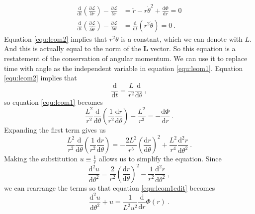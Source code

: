 \documentclass[english, oneside]{HYgradu}
\begin{document}
\begin{align}
\frac{\mathrm{d} }{\mathrm{d} t} \left( \frac{\partial \mathcal{L}}{\partial \dot{r}} \right) - \frac{\partial \mathcal{L}}{\partial r} &= \ddot{r} - r \dot{\theta}^2 + \frac{\mathrm{d} \Phi}{\mathrm{d} r} = 0 \label{equ:leom1} \\
\frac{\mathrm{d} }{\mathrm{d} t} \left( \frac{\partial \mathcal{L}}{\partial \dot{\theta}} \right) - \frac{\partial \mathcal{L}}{\partial \theta} &= \frac{\mathrm{d}}{\mathrm{d} t} (r^2 \dot{\theta}) = 0 \label{equ:leom2} \ .
\end{align}
Equation \eqref{equ:leom2} implies that $r^2 \dot{\theta}$ is a constant, which we can denote with $L$. And this is actually equal to the norm of the $\mathbf{L}$ vector. So this equation is a restatement of the conservation of angular momentum. We can use it to replace time with angle as the independent variable in equation \eqref{equ:leom1}. Equation \eqref{equ:leom2} implies that
\begin{equation}
\frac{\mathrm{d}}{\mathrm{d} t} = \frac{L}{r^2} \frac{\mathrm{d}}{\mathrm{d} \theta} \ ,
\end{equation}
so equation \eqref{equ:leom1} becomes
\begin{equation}
\frac{L^2}{r^2} \frac{\mathrm{d}}{\mathrm{d} \theta} \left( \frac{1}{r^2} \frac{\mathrm{d} r}{\mathrm{d} \theta} \right) - \frac{L^2}{r^3} = -\frac{\mathrm{d} \Phi}{\mathrm{d} r} \label{equ:leom1edit} \ .
\end{equation}
Expanding the first term gives us 
\begin{equation}
\frac{L^2}{r^2} \frac{\mathrm{d}}{\mathrm{d} \theta} \left( \frac{1}{r^2} \frac{\mathrm{d} r}{\mathrm{d} \theta} \right) = -\frac{2 L^2}{r^5} \left( \frac{\mathrm{d} r}{\mathrm{d} \theta} \right)^2 + \frac{L^2}{r^4} \frac{\mathrm{d}^2 r}{\mathrm{d} \theta^2} \ .
\end{equation}
Making the substitution $u \equiv \frac{1}{r}$ allows us to simplify the equation. Since
\begin{equation}
\frac{\mathrm{d}^2 u}{\mathrm{d} \theta^2} = \frac{2}{r^2} \left( \frac{\mathrm{d} r}{\mathrm{d} \theta} \right)^2 - \frac{1}{r^2} \frac{\mathrm{d}^2 r}{\mathrm{d} \theta^2} \ ,
\end{equation}
we can rearrange the terms so that equation \eqref{equ:leom1edit} becomes
\begin{equation}
\frac{\mathrm{d}^2 u}{\mathrm{d} \theta^2} + u = \frac{1}{L^2 u^2} \frac{\mathrm{d}}{\mathrm{d} r} \Phi (r) \ .
\end{equation}
\end{document}

